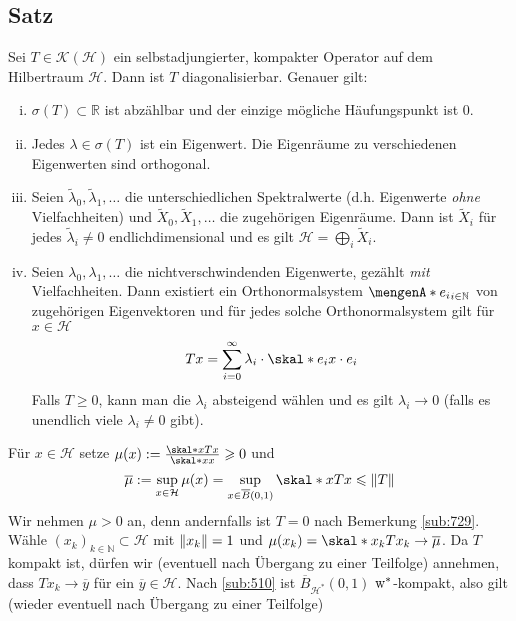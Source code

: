 \subsection[Satz: Diagonalisierbarkeit selbstadjungierter, kompakter Operatoren]{Satz} %
\label{sub:810}
Sei $T \in \mathcal{K}(\mathcal{H})$ ein selbstadjungierter, kompakter Operator auf dem Hilbertraum $\mathcal{H}$. Dann ist $T$ diagonalisierbar. Genauer gilt:
\begin{enumerate}[(i)]
	\item $\sigma(T) \subset \mathds{R}$ ist abzählbar und der einzige mögliche Häufungspunkt ist $0$.
	\item Jedes $\lambda \in \sigma(T)$ ist ein Eigenwert. Die Eigenräume zu verschiedenen Eigenwerten sind orthogonal.
	\item Seien $\tilde{\lambda}_0, \tilde{\lambda}_1, \ldots $ die unterschiedlichen Spektralwerte (d.h. Eigenwerte \emph{ohne} Vielfachheiten) und 
	$\tilde{X}_0,\tilde{X}_1,\ldots$ die zugehörigen Eigenräume. Dann ist $\tilde{X}_i$ für jedes $\tilde{\lambda}_i\not=0$ endlichdimensional und es gilt 
	$\mathcal{H}= \bigoplus_i \tilde{X}_i$.
	\item Seien $\lambda_0, \lambda_1,\ldots $ die nichtverschwindenden Eigenwerte, gezählt \emph{mit} Vielfachheiten. Dann existiert ein Orthonormalsystem 
	$\set{e_i}_{i \in \mathds{N}}$ von zugehörigen Eigenvektoren und für jedes solche Orthonormalsystem gilt für $x \in \mathcal{H}$
	\[
		T x = \sum_{i=0}^{\infty} \lambda_i \cdot \skal*{e_i}{x} \cdot e_i 
	\]
	Falls $T\ge 0$, kann man die $\lambda_i$ absteigend wählen und es gilt $\lambda_i \to 0$ (falls es unendlich viele $\lambda_i\not=0$ gibt).
\end{enumerate}
Für $x \in \mathcal{H}$ setze $\mu(x) := \frac{\skal*{x}{T x}}{\skal*{x}{x}}\ge 0$ und 
\[
	\overline{\mu} := \sup_{x \in \mathcal{H}} \mu(x) = \sup_{x \in \overline{B}(0,1)} \skal*{x}{T x} \le \norm{T} 
\]
Wir nehmen $\mu >0$ an, denn andernfalls ist $T=0$ nach Bemerkung \ref{sub:729}. Wähle $(x_k)_{k \in \mathds{N}} \subset \mathcal{H}$ mit $\norm{x_k}=1$ und 
$\mu(x_k)= \skal*{x_k}{T x_k} \to \overline{\mu}$. Da $T$ kompakt ist, dürfen wir (eventuell nach Übergang zu einer Teilfolge) annehmen, dass $T x_k \to \overline{y}$ für
ein $\overline{y}\in \mathcal{H}$.
Nach \ref{sub:510} ist $\overline{B}_{\mathcal{H}^*}(0,1)$ $\mathrm{w}^*$-kompakt, also gilt (wieder eventuell nach Übergang zu einer Teilfolge) 
